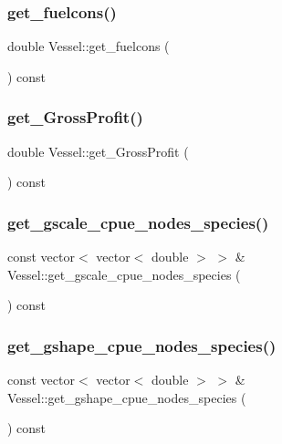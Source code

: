 \subsubsection{\texorpdfstring{get\_fuelcons()}{get\_fuelcons()}}
{\footnotesize\ttfamily double Vessel\+::get\+\_\+fuelcons (\begin{DoxyParamCaption}{ }\end{DoxyParamCaption}) const}

\mbox{\label{class_vessel_a692bd95b15f1ae09235d1e041fbaa36a}} 
\subsubsection{\texorpdfstring{get\_GrossProfit()}{get\_GrossProfit()}}
{\footnotesize\ttfamily double Vessel\+::get\+\_\+\+Gross\+Profit (\begin{DoxyParamCaption}{ }\end{DoxyParamCaption}) const}

\mbox{\label{class_vessel_a6ea61e6131a74a7053dff1787c1d084e}} 
\subsubsection{\texorpdfstring{get\_gscale\_cpue\_nodes\_species()}{get\_gscale\_cpue\_nodes\_species()}}
{\footnotesize\ttfamily const vector$<$ vector$<$ double $>$ $>$ \& Vessel\+::get\+\_\+gscale\+\_\+cpue\+\_\+nodes\+\_\+species (\begin{DoxyParamCaption}{ }\end{DoxyParamCaption}) const}

\mbox{\label{class_vessel_a8aa34895916268b2d0ce2b59f9713f3b}} 
\subsubsection{\texorpdfstring{get\_gshape\_cpue\_nodes\_species()}{get\_gshape\_cpue\_nodes\_species()}}
{\footnotesize\ttfamily const vector$<$ vector$<$ double $>$ $>$ \& Vessel\+::get\+\_\+gshape\+\_\+cpue\+\_\+nodes\+\_\+species (\begin{DoxyParamCaption}{ }\end{DoxyParamCaption}) const}

